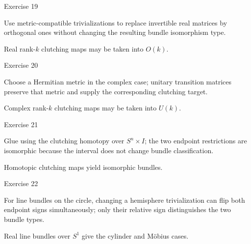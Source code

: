 \begin{exercise}\label{exr:viii30-19}
Exercise 19
\end{exercise}
\begin{hint}
Use metric-compatible trivializations to replace invertible real matrices by orthogonal ones without changing the resulting bundle isomorphism type.
\end{hint}
\begin{solution}
Real rank-\(k\) clutching maps may be taken into \(O(k)\).
\end{solution}

\begin{exercise}\label{exr:viii30-20}
Exercise 20
\end{exercise}
\begin{hint}
Choose a Hermitian metric in the complex case; unitary transition matrices preserve that metric and supply the corresponding clutching target.
\end{hint}
\begin{solution}
Complex rank-\(k\) clutching maps may be taken into \(U(k)\).
\end{solution}

\begin{exercise}\label{exr:viii30-21}
Exercise 21
\end{exercise}
\begin{hint}
Glue using the clutching homotopy over \(S^n\times I\); the two endpoint restrictions are isomorphic because the interval does not change bundle classification.
\end{hint}
\begin{solution}
Homotopic clutching maps yield isomorphic bundles.
\end{solution}

\begin{exercise}\label{exr:viii30-22}
Exercise 22
\end{exercise}
\begin{hint}
For line bundles on the circle, changing a hemisphere trivialization can flip both endpoint signs simultaneously; only their relative sign distinguishes the two bundle types.
\end{hint}
\begin{solution}
Real line bundles over \(S^1\) give the cylinder and Möbius cases.
\end{solution}

